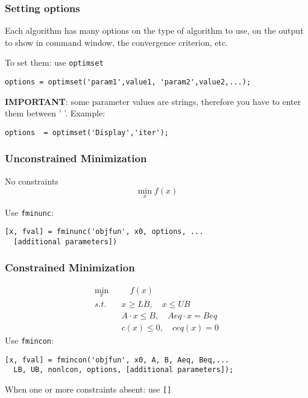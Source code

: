 \documentclass[show notes]{beamer}%
\begin{document}
\begin{frame}[fragile]
\frametitle{Setting options}

Each algorithm has many options on the type of algorithm to use, on the output to show in command window, the convergence criterion, etc. \pause

To set them: use \texttt{optimset}
{\small
\begin{lstlisting}
options = optimset('param1',value1, 'param2',value2,...);
\end{lstlisting}
}\pause

\textbf{IMPORTANT}: some parameter values are strings, therefore you have to enter them between '    '. Example:

\begin{lstlisting}
options  = optimset('Display','iter');
\end{lstlisting}

\end{frame}




\begin{frame}[fragile]
\frametitle{Unconstrained Minimization}
No constraints
\begin{equation*}
\min_{x} f(x)
\end{equation*} \pause

Use \texttt{fminunc}:

\begin{lstlisting}
[x, fval] = fminunc('objfun', x0, options, ...
  [additional parameters])
\end{lstlisting}
\end{frame}

\begin{frame}[fragile]
\frametitle{Constrained Minimization}

\begin{align*}
\min_{x} &\quad f(x) \\
s.t. \quad & x \geq LB, \quad x \leq UB \\
& A \cdot x \leq B, \quad Aeq \cdot x = Beq \\
& c(x) \leq 0, \quad ceq(x) = 0
\end{align*} \pause
Use \texttt{fmincon}:

\begin{lstlisting}
[x, fval] = fmincon('objfun', x0, A, B, Aeq, Beq,...
  LB, UB, nonlcon, options, [additional parameters]);
\end{lstlisting}
When one or more constraints absent: use \texttt{[]}

\end{frame}
\end{document}
